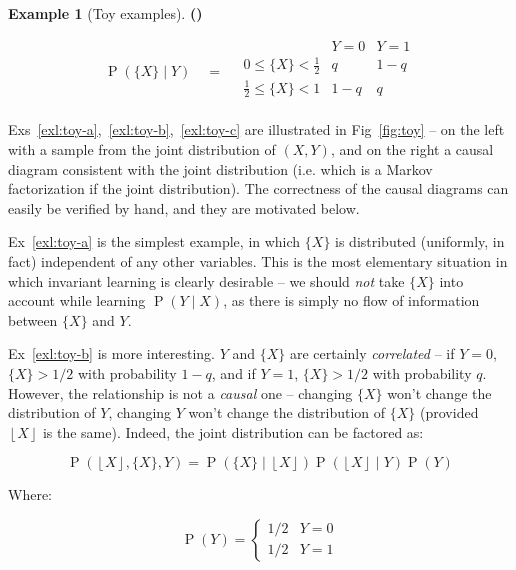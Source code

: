 \documentclass[12pt]{article}
\newcommand{\Prob}[1]{\operatorname{P}\left(#1\right)}
\newcommand{\floor}[1]{\left\lfloor #1 \right\rfloor}
\theoremstyle{definition}
\newtheorem{exl}[thm]{Example}
\newcounter{subexl}[thm]
\newenvironment{subexl}{
    \refstepcounter{subexl}
    \bigskip
    \noindent
    \textbf{(\alph{subexl})~}%
}{}
\numberwithin{equation}{section}
\numberwithin{figure}{section}
\numberwithin{table}{section}
\begin{document}
\begin{exl}[Toy examples]
\begin{subexl}
    \begin{equation*}
        \Prob{\{X\}\mid Y} \,\,\,\,\,\, = \,\,\,\,\,\,
    \begin{array}{l|rr}
         & Y=0 & Y=1 \\
         \hline
         0 \le \{X\} < \frac12 & q & 1-q \\
         \frac12 \le \{X\} < 1 & 1-q &  q \\
    \end{array} 
    \end{equation*}

\end{subexl}

\end{exl}

Exs~\ref{exl:toy-a},~\ref{exl:toy-b},~\ref{exl:toy-c} are illustrated in Fig~\ref{fig:toy} -- on the left with a sample from the joint distribution of $(X, Y)$, and on the right a causal diagram consistent with the joint distribution (i.e. which is a Markov factorization if the joint distribution). The correctness of the causal diagrams can easily be verified by hand, and they are motivated below.

Ex~\ref{exl:toy-a} is the simplest example, in which $\{X\}$ is distributed (uniformly, in fact) independent of any other variables. This is the most elementary situation in which invariant learning is clearly desirable -- we should \emph{not} take $\{X\}$  into account while learning $\Prob{Y\mid X}$, as there is simply no flow of information between $\{X\}$ and $Y$.

Ex~\ref{exl:toy-b} is more interesting. $Y$ and $\{X\}$ are certainly \emph{correlated} -- if $Y=0$, $\{X\}>1/2$ with probability $1-q$, and if $Y=1$, $\{X\}>1/2$ with probability $q$. However, the relationship is not a \emph{causal} one -- changing $\{X\}$ won't change the distribution of $Y$, changing $Y$ won't change the distribution of $\{X\}$ (provided $\floor{X}$ is the same). Indeed, the joint distribution can be factored as:

\begin{equation*}
    \Prob{\floor{X}, \{X\}, Y} = \Prob{\{X\}\mid \floor{X}}\Prob{\floor{X}\mid Y}\Prob{Y}
\end{equation*}

Where: 

\begin{equation*}
    \Prob{Y} =
    \begin{cases}
        1/2 & Y=0 \\ 
        1/2 & Y=1 
    \end{cases}
\end{equation*}
\end{document}
